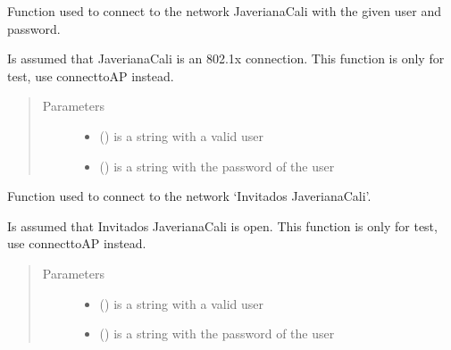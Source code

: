 \documentclass[letterpaper,10pt,english]{sphinxhowto}
\begin{document}
\begin{fulllineitems}
\label{\detokenize{index:nm_dbus_python.JaverianaCali}}
Function used to connect to the network JaverianaCali with the given user and password.

Is assumed that JaverianaCali is an 802.1x connection. This function is only for test, 
use connecttoAP instead.
\begin{quote}\begin{description}
\item[{Parameters}] \leavevmode\begin{itemize}
\item {} 
 () \textendash{} is a string with a valid user

\item {} 
 () \textendash{} is a string with the password of the user

\end{itemize}

\end{description}\end{quote}

\end{fulllineitems}


\begin{fulllineitems}
\label{\detokenize{index:nm_dbus_python.Invitados_JaverianaCali}}
Function used to connect to the network ‘Invitados JaverianaCali’.

Is assumed that Invitados JaverianaCali is open. This function is only for test, 
use connecttoAP instead.
\begin{quote}\begin{description}
\item[{Parameters}] \leavevmode\begin{itemize}
\item {} 
 () \textendash{} is a string with a valid user

\item {} 
 () \textendash{} is a string with the password of the user

\end{itemize}

\end{description}\end{quote}

\end{fulllineitems}
\end{document}
